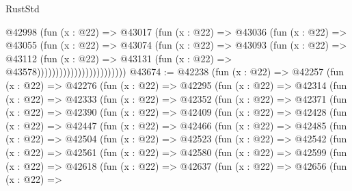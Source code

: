 \begin{lexlean}{RustStd}
\begin{coremodule}
                                  @42998
                                    (fun (x : @22) =>
                                    @43017
                                      (fun (x : @22) =>
                                      @43036
                                        (fun (x : @22) =>
                                        @43055
                                          (fun (x : @22) =>
                                          @43074
                                            (fun (x : @22) =>
                                            @43093
                                              (fun (x : @22) =>
                                              @43112
                                                (fun (x : @22) =>
                                                @43131
                                                  (fun (x : @22) => @43578))))))))))))))))))))))))
@43674 := @42238
    (fun (x : @22) =>
    @42257
      (fun (x : @22) =>
      @42276
        (fun (x : @22) =>
        @42295
          (fun (x : @22) =>
          @42314
            (fun (x : @22) =>
            @42333
              (fun (x : @22) =>
              @42352
                (fun (x : @22) =>
                @42371
                  (fun (x : @22) =>
                  @42390
                    (fun (x : @22) =>
                    @42409
                      (fun (x : @22) =>
                      @42428
                        (fun (x : @22) =>
                        @42447
                          (fun (x : @22) =>
                          @42466
                            (fun (x : @22) =>
                            @42485
                              (fun (x : @22) =>
                              @42504
                                (fun (x : @22) =>
                                @42523
                                  (fun (x : @22) =>
                                  @42542
                                    (fun (x : @22) =>
                                    @42561
                                      (fun (x : @22) =>
                                      @42580
                                        (fun (x : @22) =>
                                        @42599
                                          (fun (x : @22) =>
                                          @42618
                                            (fun (x : @22) =>
                                            @42637
                                              (fun (x : @22) =>
                                              @42656
                                                (fun (x : @22) =>

\end{coremodule}
\end{lexlean}

